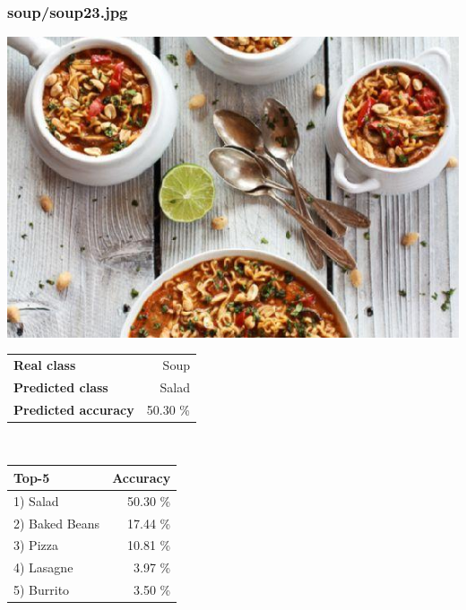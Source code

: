 \subsubsection{soup/soup23.jpg}

\begin{minipage}[t]{0.4\textwidth}
	\vspace{0pt}
	\includegraphics[width=\linewidth]{images/evaluation-images/soup/soup23.jpg}
\end{minipage}
\hfill
\begin{minipage}[t]{0.5\textwidth}
	\vspace{0pt}\raggedright
	\begin{tabularx}{\textwidth}{X r}
		\small \textbf{Real class} & \small Soup\\
		\small \textbf{Predicted class} & \small Salad\\
		\small \textbf{Predicted accuracy} & \small 50.30 \%
    \end{tabularx}\\
    
    \vspace{6pt}
	\begin{tabularx}{\textwidth}{X r}
        \small \textbf{Top-5} & \small \textbf{Accuracy} \\
        \hline
		\small 1) Salad & \small 50.30 \%\\\small 2) Baked Beans & \small 17.44 \%\\\small 3) Pizza & \small 10.81 \%\\\small 4) Lasagne & \small 3.97 \%\\\small 5) Burrito & \small 3.50 \%
    \end{tabularx}
\end{minipage}
    
